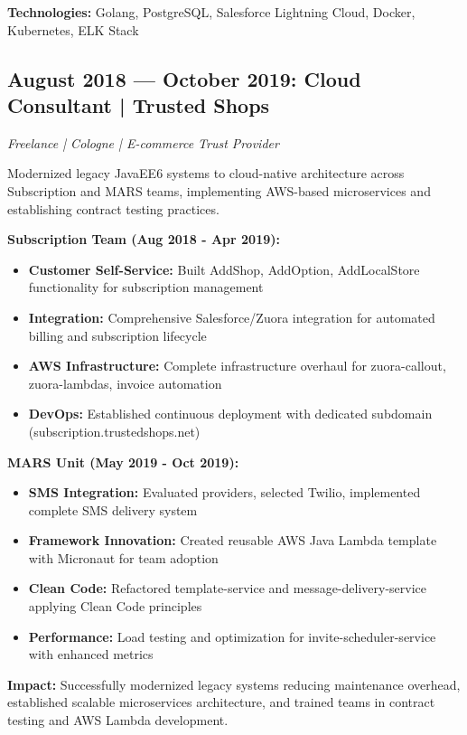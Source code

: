\documentclass[10pt,a4paper]{article}
\begin{document}
\textbf{Technologies:} Golang, PostgreSQL, Salesforce Lightning Cloud, Docker, Kubernetes, ELK Stack

\vspace{6pt}

\subsection{August 2018 — October 2019: Cloud Consultant | Trusted Shops}
\textit{Freelance | Cologne | E-commerce Trust Provider}

Modernized legacy JavaEE6 systems to cloud-native architecture across Subscription and MARS teams, implementing AWS-based microservices and establishing contract testing practices.

\textbf{Subscription Team (Aug 2018 - Apr 2019):}
\begin{itemize}
    \item \textbf{Customer Self-Service:} Built AddShop, AddOption, AddLocalStore functionality for subscription management
    \item \textbf{Integration:} Comprehensive Salesforce/Zuora integration for automated billing and subscription lifecycle
    \item \textbf{AWS Infrastructure:} Complete infrastructure overhaul for zuora-callout, zuora-lambdas, invoice automation
    \item \textbf{DevOps:} Established continuous deployment with dedicated subdomain (subscription.trustedshops.net)
\end{itemize}

\textbf{MARS Unit (May 2019 - Oct 2019):}
\begin{itemize}
    \item \textbf{SMS Integration:} Evaluated providers, selected Twilio, implemented complete SMS delivery system
    \item \textbf{Framework Innovation:} Created reusable AWS Java Lambda template with Micronaut for team adoption
    \item \textbf{Clean Code:} Refactored template-service and message-delivery-service applying Clean Code principles
    \item \textbf{Performance:} Load testing and optimization for invite-scheduler-service with enhanced metrics
\end{itemize}

\textbf{Impact:} Successfully modernized legacy systems reducing maintenance overhead, established scalable microservices architecture, and trained teams in contract testing and AWS Lambda development.
\end{document}
